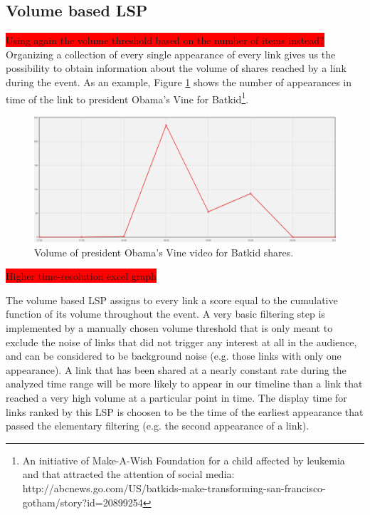 \documentclass{sig-alternate}
\newcommand{\todo}[1]{\colorbox{red}{#1}}
\begin{document}
\subsection{Volume based LSP}
\label{sec:volume_based_links_selection}
\todo{Using again the volume threshold based on the number of items instead?}
Organizing a collection of every single appearance of every link gives us the possibility to obtain information about the volume of shares reached by a link during the event. As an example, Figure \ref{fig:batkid_whitehouse_volume} shows the number of appearances in time of the link to president Obama's Vine for Batkid\footnote{An initiative of Make-A-Wish Foundation for a child affected by leukemia and that attracted the attention of social media: http://abcnews.go.com/US/batkids-make-transforming-san-francisco-gotham/story?id=20899254}.
\begin{figure}[htbp]
  \centering
  \includegraphics[width=\linewidth]{Figures/batkid_whitehouse_volume.png}
  \caption{Volume of president Obama's Vine video for Batkid shares.}
  \label{fig:batkid_whitehouse_volume}
\end{figure} \todo{Higher time-resolution excel graph}

The volume based LSP assigns to every link a score equal to the cumulative function of its volume throughout the event. A very basic filtering step is implemented by a manually chosen volume threshold that is only meant to exclude the noise of links that did not trigger any interest at all in the audience, and can be considered to be background noise (e.g. those links with only one appearance). A link that has been shared at a nearly constant rate during the analyzed time range will be more likely to appear in our timeline than a link that reached a very high volume at a particular point in time. The display time for links ranked by this LSP is choosen to be the time of the earliest appearance that passed the elementary filtering (e.g. the second appearance of a link).
\end{document}

